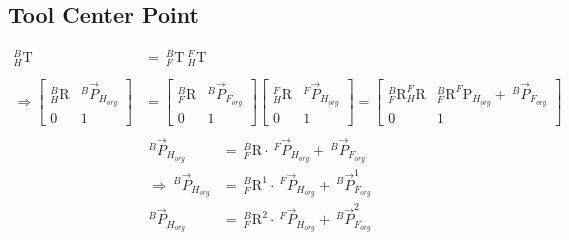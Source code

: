 \documentclass[12pt]{article}
\begin{document}
\begin{CJK}{UTF8}{bsmi}
\section{Tool Center Point}
\begin{equation*}
\begin{split}
_{H}^{B}\textrm{T} &=\  _{F}^{B}\textrm{T}\ _{H}^{F}\textrm{T}\\\\
\Rightarrow																												
\begin{bmatrix}
_{H}^{B}\textrm{R} & ^{B}\vec{P}_{H_{org}}\\ 
0 & 1
\end{bmatrix} &=
\begin{bmatrix}
_{F}^{B}\textrm{R} & ^{B}\vec{P}_{F_{org}}\\ 
0 & 1
\end{bmatrix}
\begin{bmatrix}
_{H}^{F}\textrm{R} & ^{F}\vec{P}_{H_{org}}\\ 
0 & 1
\end{bmatrix}
= 
\begin{bmatrix}
_{F}^{B}\textrm{R}_{H}^{F}\textrm{R} & _{F}^{B}\textrm{R}^{F}\textrm{P}_{H_{org}} +\ ^{B}\vec{P}_{F_{org}}\\ 
0 & 1
\end{bmatrix}\\
\end{split}
\end{equation*}		
\begin{equation*}
\begin{split}																									
^{B}\vec{P}_{H_{org}} &=\  _{F}^{B}\textrm{R}\cdot\ ^{F}\vec{P}_{H_{org}} +\ ^{B}\vec{P}_{F_{org}}\\
\Rightarrow\ 
^{B}\vec{P}_{H_{org}} &=\  _{F}^{B}\textrm{R}^{1}\cdot\ ^{F}\vec{P}_{H_{org}} +\ ^{B}\vec{P}_{F_{org}}^{1}\\
^{B}\vec{P}_{H_{org}} &=\  _{F}^{B}\textrm{R}^{2}\cdot\ ^{F}\vec{P}_{H_{org}} +\ ^{B}\vec{P}_{F_{org}}^{2}\\

\end{split}
\end{equation*}
\end{CJK}
\end{document}
